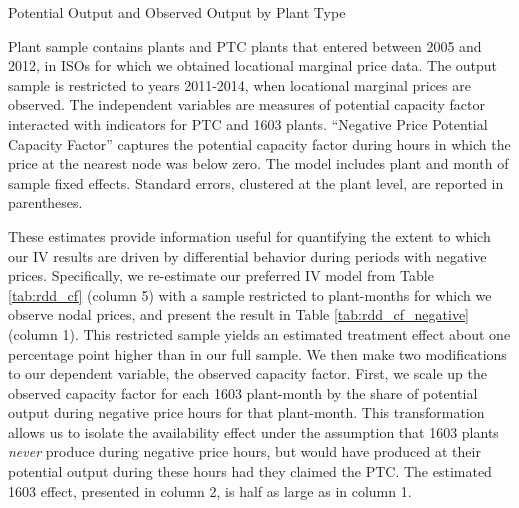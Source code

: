 \documentclass[12pt]{article}
\begin{document}
\begin{table}[H]
  \caption{Potential Output and Observed Output by Plant Type \label{tab:PlantNegativeCFRegs}}
  \begin{center}
    \footnotesize{
    
    }
  \end{center}
  \footnotesize
  Plant sample contains   plants and  \unskip PTC plants that entered between 2005 and 2012, in ISOs for which we obtained locational marginal price data. The output sample is restricted to years 2011-2014, when locational marginal prices are observed. The independent variables are measures of potential capacity factor interacted with indicators for PTC and 1603 plants. ``Negative Price Potential Capacity Factor'' captures the potential capacity factor during hours in which the price at the nearest node was below zero. The model includes plant and month of sample fixed effects. Standard errors, clustered at the plant level, are reported in parentheses.
\end{table}

These estimates provide information useful for quantifying the extent to which our IV results are driven by differential behavior during periods with negative prices. Specifically, we re-estimate our preferred IV model from Table \ref{tab:rdd_cf} (column 5) with a sample restricted to plant-months for which we observe nodal prices, and present the result in Table \ref{tab:rdd_cf_negative} (column 1). This restricted sample yields an estimated treatment effect about one percentage point higher than in our full sample. We then make two modifications to our dependent variable, the observed capacity factor. First, we scale up the observed capacity factor for each 1603 plant-month by the share of potential output during negative price hours for that plant-month. This transformation allows us to isolate the availability effect under the assumption that 1603 plants \emph{never} produce during negative price hours, but would have produced at their potential output during these hours had they claimed the PTC. The estimated 1603 effect, presented in column 2, is half as large as in column 1. 
\end{document}
